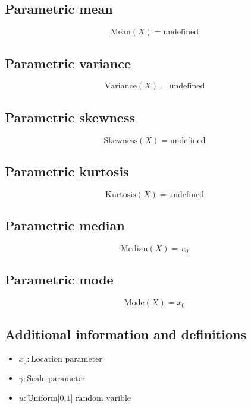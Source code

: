\documentclass{article}
\begin{document}
\subsection{Parametric mean}
\begin{equation*} \mathrm{Mean}(X)=\text{undefined} \end{equation*}
\subsection{Parametric variance}
\begin{equation*} \mathrm{Variance}(X)=\text{undefined} \end{equation*}
\subsection{Parametric skewness}
\begin{equation*} \mathrm{Skewness}(X)=\text{undefined} \end{equation*}
\subsection{Parametric kurtosis}
\begin{equation*} \mathrm{Kurtosis}(X)=\text{undefined} \end{equation*}
\subsection{Parametric median}
\begin{equation*} \mathrm{Median}(X)=x_0 \end{equation*}
\subsection{Parametric mode}
\begin{equation*} \mathrm{Mode}(X)=x_0 \end{equation*}
\subsection{Additional information and definitions}
\begin{itemize}
    \item $ x_0:\text{Location parameter} $
    \item $ \gamma:\text{Scale parameter} $
    \item $ u:\text{Uniform[0,1] random varible} $
\end{itemize}
\end{document}
